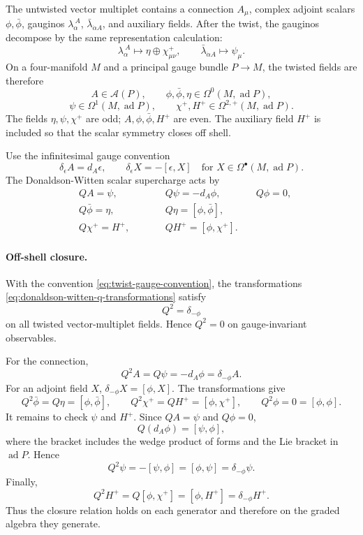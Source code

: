 The untwisted vector multiplet contains a connection \(A_\mu\), complex
adjoint scalars \(\phi,\bar\phi\), gauginos
\(\lambda_\alpha^{\ A}\), \(\bar\lambda_{\dot\alpha A}\), and auxiliary
fields.  After the twist, the gauginos decompose by the same representation
calculation:
\[
  \lambda_\alpha^{\ A}
  \longmapsto
  \eta\oplus\chi^+_{\mu\nu},
  \qquad
  \bar\lambda_{\dot\alpha A}
  \longmapsto
  \psi_\mu .
\]
On a four-manifold \(M\) and a principal gauge bundle \(P\to M\), the
twisted fields are therefore
\[
  A\in\mathcal A(P),
  \qquad
  \phi,\bar\phi,\eta\in\Omega^0(M,\operatorname{ad}P),
\]
\[
  \psi\in\Omega^1(M,\operatorname{ad}P),
  \qquad
  \chi^+,H^+\in\Omega^{2,+}(M,\operatorname{ad}P).
\]
The fields \(\eta,\psi,\chi^+\) are odd; \(A,\phi,\bar\phi,H^+\) are even.
The auxiliary field \(H^+\) is included so that the scalar symmetry closes
off shell.

Use the infinitesimal gauge convention
\begin{equation}
  \delta_\epsilon A=d_A\epsilon,
  \qquad
  \delta_\epsilon X=-[\epsilon,X]
  \quad\text{for }X\in\Omega^\bullet(M,\operatorname{ad}P).
  \label{eq:twist-gauge-convention}
\end{equation}
The Donaldson-Witten scalar supercharge acts by
\begin{equation}
\begin{aligned}
  &QA=\psi,\qquad &&Q\psi=-d_A\phi,\qquad &&Q\phi=0,\\
  &Q\bar\phi=\eta,\qquad &&Q\eta=[\phi,\bar\phi],\\
  &Q\chi^+=H^+,\qquad &&QH^+=[\phi,\chi^+] .
\end{aligned}
\label{eq:donaldson-witten-q-transformations}
\end{equation}

\paragraph{Off-shell closure.}
With the convention \eqref{eq:twist-gauge-convention}, the transformations
\eqref{eq:donaldson-witten-q-transformations} satisfy
\[
  Q^2=\delta_{-\phi}
\]
on all twisted vector-multiplet fields.  Hence \(Q^2=0\) on gauge-invariant
observables.

For the connection,
\[
  Q^2A=Q\psi=-d_A\phi=\delta_{-\phi}A.
\]
For an adjoint field \(X\), \(\delta_{-\phi}X=[\phi,X]\).  The transformations
give
\[
  Q^2\bar\phi=Q\eta=[\phi,\bar\phi],
  \qquad
  Q^2\chi^+=QH^+=[\phi,\chi^+],
  \qquad
  Q^2\phi=0=[\phi,\phi].
\]
It remains to check \(\psi\) and \(H^+\).  Since \(QA=\psi\) and
\(Q\phi=0\),
\[
  Q(d_A\phi)=[\psi,\phi],
\]
where the bracket includes the wedge product of forms and the Lie bracket in
\(\operatorname{ad}P\).  Hence
\[
  Q^2\psi=-[\psi,\phi]=[\phi,\psi]=\delta_{-\phi}\psi.
\]
Finally,
\[
  Q^2H^+=Q[\phi,\chi^+]=[\phi,H^+]=\delta_{-\phi}H^+ .
\]
Thus the closure relation holds on each generator and therefore on the
graded algebra they generate.

